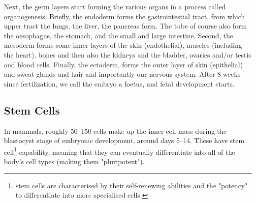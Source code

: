 Next, the germ layers start forming the various organs in a process called organogenesis.
Briefly, the endoderm forms the gastrointestial tract, from which upper tract the lungs, the liver, the pancreas form. 
The tube of course also form the oesophagus, the stomach, and the small and large intestine.
Second, the mesoderm forms some inner layers of the skin (endothelial), muscles (including the heart), bones and then also the kidneys and the bladder, ovaries and/or testis and blood cells.
Finally, the ectoderm, forms the outer layer of skin (epithelial) and sweat glands and hair and importantly our nervous system.
After 8 weeks since fertilization, we call the embryo a foetus, and fetal development starts.








\subsection{Stem Cells}

In mammals, roughly 50–150 cells make up the inner cell mass during the blastocyst stage of embryonic development, around days 5–14. 
These have stem cell\footnote{stem cells are characterised by their self-renewing abilities and the "potency" to differentiate into more specialised cells.} capability, meaning that they can eventually differentiate into all of the body's cell types (making them "pluripotent").

